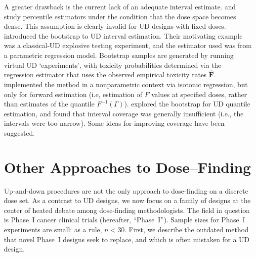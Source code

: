 A greater drawback is the current lack of an adequate interval estimate.  \cite{Wright:1984} and \cite{Muke:1993} study percentile estimators under the condition that the dose space becomes dense.  This assumption is clearly invalid for UD designs with fixed doses.  \cite{Chao:Fuh:boot:2001} introduced the bootstrap to UD interval estimation. Their motivating example was a classical-UD explosive testing experiment, and the estimator used was from a parametric regression model. Bootstrap samples are generated by running virtual UD `experiments', with toxicity probabilities determined via the regression estimator that uses the observed empirical toxicity rates $\mathbf{\hat{F}}$.  \cite{Styl:Pros:Flou:esti:2003} implemented the method in a nonparametric context via isotonic regression, but only for forward estimation (i.e, estimation of $F$ values at specified doses, rather than estimates of the quantile $F^{-1}(\Gamma)$). \cite{Oron07} explored the bootstrap for UD quantile estimation, and found that interval coverage was generally insufficient (i.e., the intervals were too narrow). Some ideas for improving coverage have been suggested.





\section{Other Approaches to Dose--Finding}\label{sec:other}

Up-and-down procedures are not the only approach to dose-finding on a discrete dose set. As a contrast to UD designs, we now focus on a family of designs at the center of heated debate among dose-finding methodologists. The field in question is Phase~I cancer clinical trials (hereafter, ``Phase~I''). Sample sizes for Phase~I experiments are small: as a rule, $n<30$. First, we describe the outdated method that novel Phase~I designs seek to replace, and which is often \citep{Rogat:etal:oped:2007,Zack:stag:2009} mistaken for a UD design.

